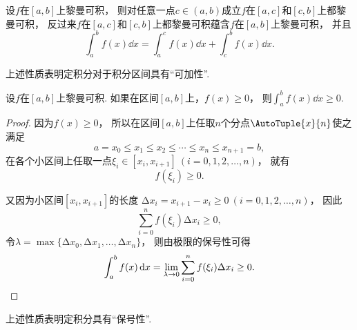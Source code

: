 \begin{property}\label{theorem:定积分.定积分性质3}
设\(f\)在\([a,b]\)上黎曼可积，
则对任意一点\(c\in(a,b)\)成立\(f\)在\([a,c]\)和\([c,b]\)上都黎曼可积，
反过来\(f\)在\([a,c]\)和\([c,b]\)上都黎曼可积蕴含\(f\)在\([a,b]\)上黎曼可积，
并且\begin{equation}
	\int_a^b f(x) \dd{x}
	= \int_a^c f(x) \dd{x}
	+ \int_c^b f(x) \dd{x}.
\end{equation}
\end{property}
上述性质表明定积分对于积分区间具有“可加性”.


\begin{property}\label{theorem:定积分.定积分性质5}
设\(f\)在\([a,b]\)上黎曼可积.
如果在区间\([a,b]\)上，\(f(x) \geq 0\)，
则\(\int_a^b f(x) \dd{x} \geq 0\).
\begin{proof}
因为\(f(x) \geq 0\)，
所以在区间\([a,b]\)上任取\(n\)个分点\(\AutoTuple{x}{n}\)使之满足\[
	a = x_0 \leq x_1 \leq x_2 \leq \dotsb \leq x_n \leq x_{n+1} = b,
\]
在各个小区间上任取一点\(\xi_i\in[x_i,x_{i+1}]\ (i=0,1,2,\dotsc,n)\)，
就有\[
	f(\xi_i)\geq0.
\]

又因为小区间\([x_i,x_{i+1}]\)的长度
\(\increment x_i = x_{i+1}-x_i \geq 0\ (i=0,1,2,\dotsc,n)\)，
因此\[
	\sum_{i=0}^n f(\xi_i) \increment x_i \geq 0,
\]
令\(\lambda = \max\{\increment x_0, \increment x_1, \dotsc, \increment x_n\}\)，
则由极限的保号性可得\[
	\int_a^b f(x) \dd{x}
	= \lim_{\lambda\to0} \sum_{i=0}^n f(\xi_i) \Delta x_i \geq 0.
	\qedhere
\]
\end{proof}
\end{property}
上述性质表明定积分具有“保号性”.

